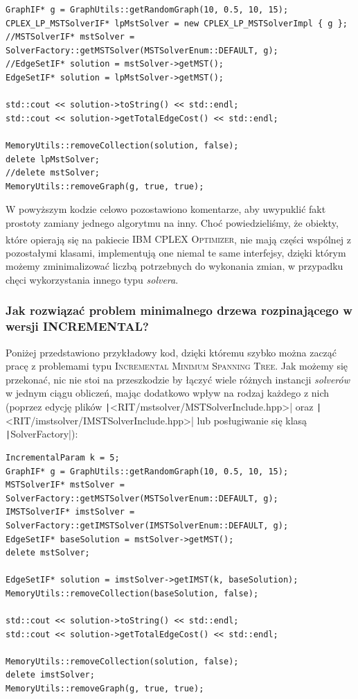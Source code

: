 \begin{verbatim}
GraphIF* g = GraphUtils::getRandomGraph(10, 0.5, 10, 15);
CPLEX_LP_MSTSolverIF* lpMstSolver = new CPLEX_LP_MSTSolverImpl { g };
//MSTSolverIF* mstSolver = SolverFactory::getMSTSolver(MSTSolverEnum::DEFAULT, g);
//EdgeSetIF* solution = mstSolver->getMST();
EdgeSetIF* solution = lpMstSolver->getMST();

std::cout << solution->toString() << std::endl;
std::cout << solution->getTotalEdgeCost() << std::endl;

MemoryUtils::removeCollection(solution, false);
delete lpMstSolver;
//delete mstSolver;
MemoryUtils::removeGraph(g, true, true);
\end{verbatim}

W powyższym kodzie celowo pozostawiono komentarze, aby uwypuklić fakt prostoty zamiany jednego algorytmu na inny. Choć powiedzieliśmy, że obiekty, które opierają się na pakiecie \textsc{IBM\textsuperscript{\textregistered} CPLEX\textsuperscript{\textregistered} Optimizer}, nie mają części wspólnej z pozostałymi klasami, implementują one niemal te same interfejsy, dzięki którym możemy zminimalizować liczbą potrzebnych do wykonania zmian, w przypadku chęci wykorzystania innego typu \textit{solvera}.

\subsubsection{Jak rozwiązać problem minimalnego drzewa rozpinającego w wersji INCREMENTAL?}

Poniżej przedstawiono przykładowy kod, dzięki któremu szybko można zacząć pracę z problemami typu \textsc{Incremental Minimum Spanning Tree}. Jak możemy się przekonać, nic nie stoi na przeszkodzie by łączyć wiele różnych instancji \textit{solverów} w jednym ciągu obliczeń, mając dodatkowo wpływ na rodzaj każdego z nich (poprzez edycję plików \texttt|<RIT/mstsolver/MSTSolverInclude.hpp>| oraz \texttt|<RIT/imstsolver/IMSTSolverInclude.hpp>| lub posługiwanie się klasą \texttt|SolverFactory|):

\begin{verbatim}
IncrementalParam k = 5;
GraphIF* g = GraphUtils::getRandomGraph(10, 0.5, 10, 15);
MSTSolverIF* mstSolver = SolverFactory::getMSTSolver(MSTSolverEnum::DEFAULT, g);
IMSTSolverIF* imstSolver = SolverFactory::getIMSTSolver(IMSTSolverEnum::DEFAULT, g);
EdgeSetIF* baseSolution = mstSolver->getMST();
delete mstSolver;

EdgeSetIF* solution = imstSolver->getIMST(k, baseSolution);
MemoryUtils::removeCollection(baseSolution, false);

std::cout << solution->toString() << std::endl;
std::cout << solution->getTotalEdgeCost() << std::endl;

MemoryUtils::removeCollection(solution, false);
delete imstSolver;
MemoryUtils::removeGraph(g, true, true);
\end{verbatim}

